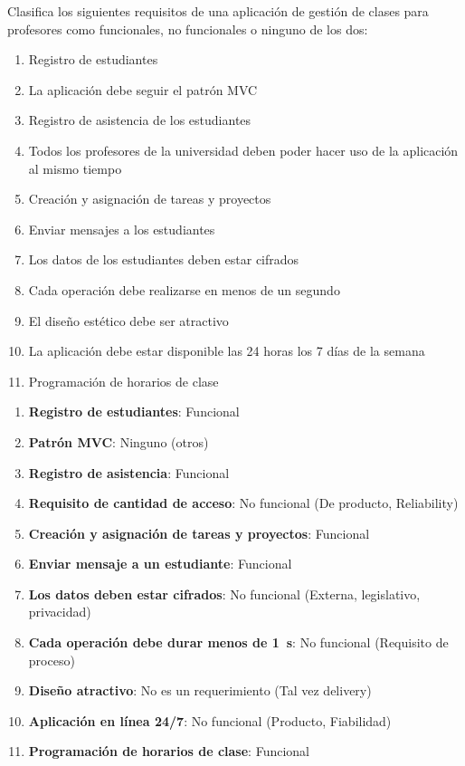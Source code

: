 

\begin{enunciado}
    Clasifica los siguientes requisitos de una aplicación de gestión de clases para profesores como
    funcionales, no funcionales o ninguno de los dos:
    \begin{enumerate}
        \item Registro de estudiantes
        \item La aplicación debe seguir el patrón MVC
        \item Registro de asistencia de los estudiantes
        \item Todos los profesores de la universidad deben poder hacer uso de la aplicación al mismo
        tiempo
        \item Creación y asignación de tareas y proyectos
        \item Enviar mensajes a los estudiantes
        \item Los datos de los estudiantes deben estar cifrados
        \item Cada operación debe realizarse en menos de un segundo
        \item El diseño estético debe ser atractivo
        \item La aplicación debe estar disponible las 24 horas los 7 días de la semana
        \item Programación de horarios de clase
    \end{enumerate}
\end{enunciado}

\begin{solucion}
    \begin{enumerate}
        \item{\textbf{Registro de estudiantes}:} Funcional
        \item{\textbf{Patrón MVC}:} Ninguno (otros)
        \item{\textbf{Registro de asistencia}:} Funcional
        \item{\textbf{Requisito de cantidad de acceso}:} No funcional (De producto, Reliability)
        \item{\textbf{Creación y asignación de tareas y proyectos}:} Funcional
        \item{\textbf{Enviar mensaje a un estudiante}:} Funcional
        \item{\textbf{Los datos deben estar cifrados}: No funcional (Externa, legislativo, privacidad)}
        \item{\textbf{Cada operación debe durar menos de \qty{1}{\second}}:} No funcional (Requisito de proceso)
        \item{\textbf{Diseño atractivo}:} No es un requerimiento (Tal vez delivery)
        \item{\textbf{Aplicación en línea 24/7}:} No funcional (Producto, Fiabilidad)
        \item{\textbf{Programación de horarios de clase}:} Funcional
    \end{enumerate}
\end{solucion}